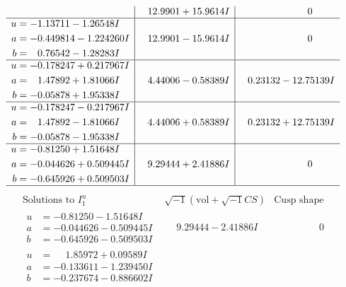\documentclass[1p]{elsarticle_modified}
\theoremstyle{definition}
\newcommand{\I}{\sqrt{-1}}
\begin{document}
$$\begin{array}{c|c|c}
 & \phantom{-}12.9901 + 15.9614 I & \phantom{-0.000000 } 0 \\ \hline\begin{aligned}
u &= -1.13711 - 1.26548 I \\
a &= -0.449814 - 1.224260 I \\
b &= \phantom{-}0.76542 - 1.28283 I\end{aligned}
 & \phantom{-}12.9901 - 15.9614 I & \phantom{-0.000000 } 0 \\ \hline\begin{aligned}
u &= -0.178247 + 0.217967 I \\
a &= \phantom{-}1.47892 + 1.81066 I \\
b &= -0.05878 + 1.95338 I\end{aligned}
 & \phantom{-}4.44006 - 0.58389 I & \phantom{-}0.23132 - 12.75139 I \\ \hline\begin{aligned}
u &= -0.178247 - 0.217967 I \\
a &= \phantom{-}1.47892 - 1.81066 I \\
b &= -0.05878 - 1.95338 I\end{aligned}
 & \phantom{-}4.44006 + 0.58389 I & \phantom{-}0.23132 + 12.75139 I \\ \hline\begin{aligned}
u &= -0.81250 + 1.51648 I \\
a &= -0.044626 + 0.509445 I \\
b &= -0.645926 + 0.509503 I\end{aligned}
 & \phantom{-}9.29444 + 2.41886 I & \phantom{-0.000000 } 0\\
 \hline 
 \end{array}$$\newpage$$\begin{array}{c|c|c}  
\text{Solutions to }I^u_{1}& \I (\text{vol} + \sqrt{-1}CS) & \text{Cusp shape}\\
 \hline 
\begin{aligned}
u &= -0.81250 - 1.51648 I \\
a &= -0.044626 - 0.509445 I \\
b &= -0.645926 - 0.509503 I\end{aligned}
 & \phantom{-}9.29444 - 2.41886 I & \phantom{-0.000000 } 0 \\ \hline\begin{aligned}
u &= \phantom{-}1.85972 + 0.09589 I \\
a &= -0.133611 - 1.239450 I \\
b &= -0.237674 - 0.886602 I\end{aligned}

\end{array}$$
\end{document}
